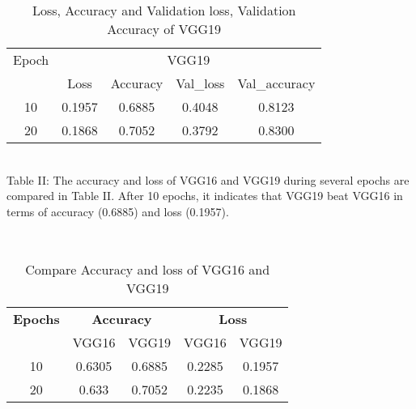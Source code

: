 \documentclass[conference]{IEEEtran}
\begin{document}

\begin{table}[htp]
\begin{center}
\caption{Loss, Accuracy and Validation loss, Validation Accuracy of VGG19}
\begin{tabular}{|c|cccc|}
\hline
\multirow{}{}{Epoch} & \multicolumn{4}{c|}{VGG19}                                                                                   \\ \cline{2-5} 
                       & \multicolumn{1}{c|}{Loss}   & \multicolumn{1}{c|}{Accuracy} & \multicolumn{1}{c|}{Val\_loss} & Val\_accuracy \\ \hline
10                     & \multicolumn{1}{c|}{0.1957} & \multicolumn{1}{c|}{0.6885}   & \multicolumn{1}{c|}{0.4048}    & 0.8123        \\ \hline
20                     & \multicolumn{1}{c|}{0.1868} & \multicolumn{1}{c|}{0.7052}   & \multicolumn{1}{c|}{0.3792}    & 0.8300        \\ \hline
\end{tabular}
\end{center}
\label{VGG19 loss ,Accuracy and Val_loss, Val_accuracy}
\end{table}

\vspace{1mm}\\
Table II: The accuracy and loss of VGG16 and VGG19 during several epochs are compared in Table II. After 10 epochs, it indicates that VGG19 beat VGG16 in terms of accuracy (0.6885) and loss (0.1957).

\vspace{1mm}\\
\begin{table}[htp]
\begin{center}
\caption{Compare Accuracy and loss of VGG16 and VGG19}
\begin{tabular}{|c|cc|cc|}
\hline
\multirow{}{}{\textbf{ Epochs}} & \multicolumn{2}{c|}{\textbf{Accuracy}} & \multicolumn{2}{c|}{\textbf{Loss}} \\ \cline{2-5} 
    & \multicolumn{1}{c|}{VGG16}  & VGG19  & \multicolumn{1}{c|}{VGG16}  & VGG19  \\ \hline
10   & \multicolumn{1}{c|}{0.6305} & 0.6885  & \multicolumn{1}{c|}{0.2285} & 0.1957 \\ \hline
20  & \multicolumn{1}{c|}{0.633} & 0.7052 & \multicolumn{1}{c|}{0.2235} & 0.1868 \\ \hline
\end{tabular}
\end{center}
\label{Compare Accuracy and loss of VGG16 and VGG19}
\end{table}
\end{document}
